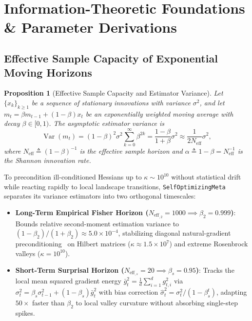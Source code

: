 \documentclass[10pt,twocolumn,letterpaper]{article}
\newtheorem{proposition}[theorem]{Proposition}
\theoremstyle{definition}
\theoremstyle{remark}
\newcommand{\Var}{\operatorname{Var}}
\newcommand{\Neff}{N_{\mathrm{eff}}}
\begin{document}
\section{Information-Theoretic Foundations \& Parameter Derivations}
\label{sec:theory}

\subsection{Effective Sample Capacity of Exponential Moving Horizons}

\begin{proposition}[Effective Sample Capacity and Estimator Variance]
\label{prop:neff}
Let $\{x_k\}_{k\ge 1}$ be a sequence of stationary innovations with variance $\sigma^2$, and let $m_t = \beta m_{t-1} + (1-\beta)x_t$ be an exponentially weighted moving average with decay $\beta \in [0, 1)$. The asymptotic estimator variance is
\begin{equation}
  \Var(m_t) = (1-\beta)^2 \sigma^2 \sum_{k=0}^{\infty} \beta^{2k} = \frac{1-\beta}{1+\beta}\sigma^2 \approx \frac{1}{2\Neff}\sigma^2,
  \label{eq:ema_variance}
\end{equation}
where $\Neff \triangleq (1-\beta)^{-1}$ is the effective sample horizon and $\alpha \triangleq 1-\beta = \Neff^{-1}$ is the Shannon innovation rate.
\end{proposition}

To precondition ill-conditioned Hessians up to $\kappa \sim 10^{10}$ without statistical drift while reacting rapidly to local landscape transitions, \texttt{SelfOptimizingMeta} separates its variance estimators into two orthogonal timescales:
\begin{itemize}[leftmargin=*,nosep]
  \item \textbf{Long-Term Empirical Fisher Horizon ($\Neff_{,2} = 1000 \implies \beta_2 = 0.999$)}: Bounds relative second-moment estimation variance to $(1-\beta_2)/(1+\beta_2) \approx 5.0 \times 10^{-4}$, stabilizing diagonal natural-gradient preconditioning~\cite{amari1998natural} on Hilbert matrices ($\kappa \approx 1.5 \times 10^7$) and extreme Rosenbrock valleys ($\kappa = 10^{10}$).
  \item \textbf{Short-Term Surprisal Horizon ($\Neff_{,s} = 20 \implies \beta_s = 0.95$)}: Tracks the local mean squared gradient energy $\bar{g}_t^2 = \frac{1}{d}\sum_{i=1}^d g_{t,i}^2$ via $\sigma_t^2 = \beta_s \sigma_{t-1}^2 + (1-\beta_s)\bar{g}_t^2$ with bias correction $\hat{\sigma}_t^2 = \sigma_t^2 / (1-\beta_s^t)$, adapting $50\times$ faster than $\beta_2$ to local valley curvature without absorbing single-step spikes.
\end{itemize}
\end{document}
